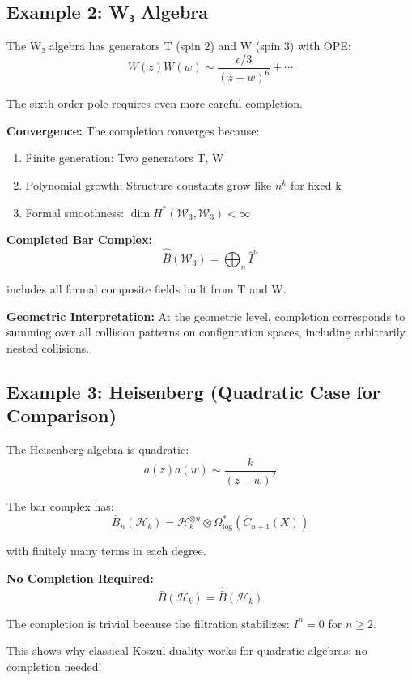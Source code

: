 \subsection{Example 2: W₃ Algebra}

\begin{example}[W₃ Completion]\label{ex:w3-completion}
The W₃ algebra has generators T (spin 2) and W (spin 3) with OPE:
$$W(z)W(w) \sim \frac{c/3}{(z-w)^6} + \cdots$$

The sixth-order pole requires even more careful completion.

\textbf{Convergence:}
The completion converges because:
\begin{enumerate}
\item Finite generation: Two generators T, W
\item Polynomial growth: Structure constants grow like $n^k$ for fixed k
\item Formal smoothness: $\dim H^*(\mathcal{W}_3, \mathcal{W}_3) < \infty$
\end{enumerate}

\textbf{Completed Bar Complex:}
$$\widehat{\bar{B}}(\mathcal{W}_3) = \bigoplus_{n} \widehat{I}^n$$

includes all formal composite fields built from T and W.

\textbf{Geometric Interpretation:}
At the geometric level, completion corresponds to summing over all collision patterns on configuration spaces, including arbitrarily nested collisions.
\end{example}

\subsection{Example 3: Heisenberg (Quadratic Case for Comparison)}

\begin{example}\label{ex:heisenberg-no-completion}
The Heisenberg algebra is quadratic:
$$a(z)a(w) \sim \frac{k}{(z-w)^2}$$

The bar complex has:
$$\bar{B}_n(\mathcal{H}_k) = \mathcal{H}_k^{\otimes n} \otimes \Omega^*_{\log}(\overline{C}_{n+1}(X))$$

with finitely many terms in each degree.

\textbf{No Completion Required:}
$$\bar{B}(\mathcal{H}_k) = \widehat{\bar{B}}(\mathcal{H}_k)$$

The completion is trivial because the filtration stabilizes: $I^n = 0$ for $n \geq 2$.

This shows why classical Koszul duality works for quadratic algebras: no completion needed!
\end{example}

